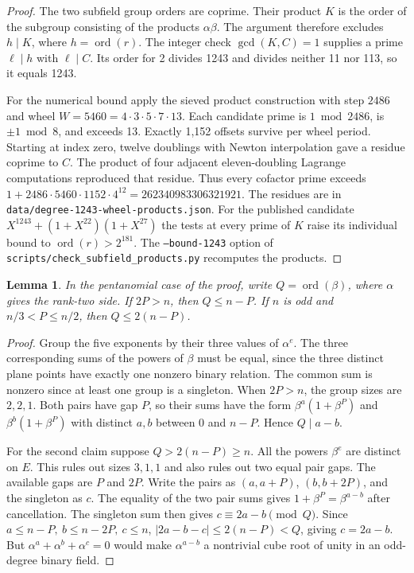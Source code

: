 \documentclass[11pt]{article}
\newtheorem{lemma}[theorem]{Lemma}
\newcommand{\ord}{\operatorname{ord}}
\begin{document}
\begin{proof}
The two subfield group orders are coprime. Their product \(K\) is the
order of the subgroup consisting of the products \(\alpha\beta\).
The argument therefore excludes \(h\mid K\), where \(h=\ord(r)\).
The integer check \(\gcd(K,C)=1\) supplies a prime \(\ell\mid h\)
with \(\ell\mid C\). Its order for 2 divides 1243 and divides neither
11 nor 113, so it equals 1243.

For the numerical bound apply the sieved product construction with
step \(2486\) and wheel \(W=5460=4\cdot3\cdot5\cdot7\cdot13\).
Each candidate prime is \(1\bmod 2486\), is \(\pm1\bmod8\),
and exceeds 13. Exactly 1,152 offsets survive per wheel period.
Starting at index zero, twelve doublings with Newton interpolation
gave a residue coprime to \(C\). The product of four adjacent
eleven-doubling Lagrange computations reproduced that residue.
Thus every cofactor prime exceeds
\(1+2486\cdot5460\cdot1152\cdot4^{12}=262340983306321921\).
The residues are in \nolinkurl{data/degree-1243-wheel-products.json}.
For the published candidate \(X^{1243}+(1+X^{22})(1+X^{27})\)
the tests at every prime of \(K\) raise its individual bound to
\(\ord(r)>2^{181}\). The \texttt{--bound-1243} option of
\nolinkurl{scripts/check_subfield_products.py} recomputes the products.
\end{proof}

\begin{lemma}\label{lem:plane-order-gaps}
In the pentanomial case of the proof, write \(Q=\ord(\beta)\), where
\(\alpha\) gives the rank-two side. If \(2P>n\), then \(Q\le n-P\).
If \(n\) is odd and \(n/3<P\le n/2\), then \(Q\le 2(n-P)\).
\end{lemma}
\begin{proof}
Group the five exponents by their three values of \(\alpha^e\).
The three corresponding sums of the powers of \(\beta\) must be
equal, since the three distinct plane points have exactly one
nonzero binary relation. The common sum is nonzero since at least
one group is a singleton. When \(2P>n\), the group sizes are
\(2,2,1\). Both pairs have gap \(P\), so their sums have the form
\(\beta^a(1+\beta^P)\) and \(\beta^b(1+\beta^P)\) with distinct
\(a,b\) between 0 and \(n-P\). Hence \(Q\mid a-b\).

For the second claim suppose \(Q>2(n-P)\ge n\).
All the powers \(\beta^e\) are distinct on \(E\). This rules out
sizes \(3,1,1\) and also rules out two equal pair gaps.
The available gaps are \(P\) and \(2P\). Write the pairs as
\((a,a+P)\), \((b,b+2P)\), and the singleton as \(c\).
The equality of the two pair sums gives
\(1+\beta^P=\beta^{a-b}\) after cancellation. The singleton sum
then gives \(c\equiv2a-b\pmod Q\).
Since \(a\le n-P,\ b\le n-2P,\ c\le n\),
\(\lvert 2a-b-c\rvert\le2(n-P)<Q\), giving \(c=2a-b\).
But \(\alpha^a+\alpha^b+\alpha^c=0\) would make
\(\alpha^{a-b}\) a nontrivial cube root of unity in an odd-degree
binary field.
\end{proof}
\end{document}
